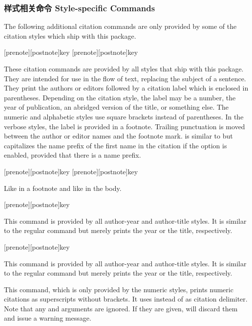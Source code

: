\subsubsection{样式相关命令 Style-specific Commands}
\label{use:cit:cbx}

The following additional citation commands are only provided by some of the citation styles which ship with this package.

\begin{ltxsyntax}

[prenote][postnote]{key}
[prenote][postnote]{key}

These citation commands are provided by all styles that ship with this package. They are intended for use in the flow of text, replacing the subject of a sentence. They print the authors or editors followed by a citation label which is enclosed in parentheses. Depending on the citation style, the label may be a number, the year of publication, an abridged version of the title, or something else. The numeric and alphabetic styles use square brackets instead of parentheses. In the verbose styles, the label is provided in a footnote. Trailing punctuation is moved between the author or editor names and the footnote mark.  is similar to  but capitalizes the name prefix of the first name in the citation if the  option is enabled, provided that there is a name prefix.

[prenote][postnote]{key}
[prenote][postnote]{key}

Like  in a footnote and like  in the body.

[prenote][postnote]{key}

This command is provided by all author-year and author-title styles. It is similar to the regular  command but merely prints the year or the title, respectively.

[prenote][postnote]{key}

This command is provided by all author-year and author-title styles. It is similar to the regular  command but merely prints the year or the title, respectively.


This command, which is only provided by the numeric styles, prints numeric citations as superscripts without brackets. It uses  instead of  as citation delimiter. Note that any  and  arguments are ignored. If they are given,  will discard them and issue a warning message.

\end{ltxsyntax}

